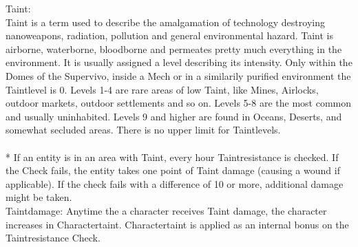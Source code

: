 \documentclass{article}
\begin{document}
    Taint: \\
    Taint is a term used to describe the amalgamation of technology destroying nanoweapons, radiation, pollution and general
    environmental hazard. Taint is airborne, waterborne, bloodborne and permeates pretty much everything in the
    environment. It is usually assigned a level describing its intensity. Only within the Domes of the Supervivo, inside a
    Mech or in a similarily purified environment the Taintlevel is 0. Levels 1-4 are rare areas of low Taint, like Mines,
    Airlocks, outdoor markets, outdoor settlements and so on. Levels 5-8 are the most common and usually uninhabited. Levels
    9 and higher are found in Oceans, Deserts, and somewhat secluded areas. There is no upper limit for Taintlevels. \\\\*
    If an entity is in an area with Taint, every hour Taintresistance is checked. If the Check fails, the entity takes
    one point of Taint damage (causing a wound if applicable). If the check fails with a difference of 10 or more,
    additional damage might be taken.\\

    Taintdamage: Anytime the a character receives Taint damage, the character increases in Charactertaint.
    Charactertaint is applied as an internal bonus on the Taintresistance Check. \\
\end{document}
